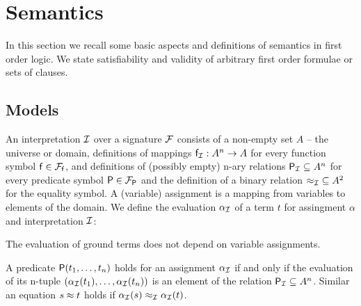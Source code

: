 \section{Semantics}\label{sec:semantics}

In this section we recall some basic aspects and definitions of semantics in first order logic.
We state satisfiability and validity of arbitrary first order formulae or sets of clauses.

\subsection{Models}

\begin{definition}\label{def:interpretation}
	An {\myem interpretation} $\mathcal{I}$ over a signature $\mathcal{F}$ consists of a
	non-empty set $A$ -- the {\myem universe} or {\myem domain},
	definitions of mappings $\mathsf{f}_{\mathcal{I}}: A^n\rightarrow A$ for every function symbol $\mathsf{f}\in{\mathcal{F}_{\mathsf{f}}}$,
	and definitions of (possibly empty) n-ary relations
	 ${\mathsf{P}_{\mathcal{I}}}\subseteq A^n$ for every predicate symbol $\mathsf{P}\in{\mathcal{F}_{\mathsf{P}}}$
	 and the definition of a binary relation ${\approx_{\mathcal{I}}}\subseteq A^2$ for the equality symbol.
	 A (variable) {\myem assignment} is a mapping from variables to elements of the domain.
	 We define the {\myem evaluation} $\alpha_{\mathcal{I}}$ of a term $t$
	 for assingment $\alpha$ and interpretation $\mathcal{I}$:
\begin{remark}
	The evaluation of ground terms does not depend on variable assignments.
\end{remark}
\end{definition}

\begin{definition}\label{def:semantics:atoms}
	A predicate $\mathsf{P}(t_1,\ldots,t_n)$
	{\myem holds} for an assignment $\alpha_{\mathcal{I}}$
	if and only if the evaluation of its n-tuple $
	(\alpha_{\mathcal{I}}({t_1}),\ldots,\alpha_{\mathcal{I}}({t_n}))$
	is an element of the relation $\mathsf{P}_{\mathcal{I}}\subseteq A^n$.
	Similar an equation $s\approx t$
	holds if $\alpha_{\mathcal{I}}(s) \approx_{\mathcal{I}} \alpha_{\mathcal{I}}(t)$.
\end{definition}


